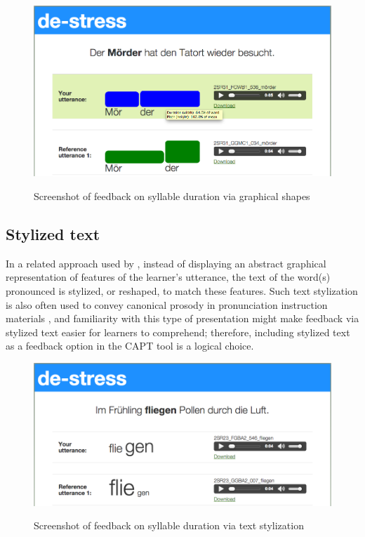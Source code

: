 	\begin{figure}
		\centering
		\caption{Screenshot of feedback on syllable duration via graphical shapes }
		\includegraphics[width=\textwidth]{img/screenshots/rectangles}
		\label{fig:visual:graphical}
	\end{figure}
	
	
	\subsection{Stylized text}
	\label{sec:visual:text}
	
	In a related approach used by \textcite{Sitaram2011}, instead of displaying an abstract graphical representation of 	features of the learner's utterance, the text of the word(s) pronounced is stylized, or reshaped, to match these features.
	Such text stylization is also often used to convey canonical prosody in pronunciation instruction materials \citep{Behme-Gissel2005,Hirschfeld2007a}, 
	and familiarity with this type of presentation might make feedback via stylized text easier for learners to comprehend; therefore,
	including stylized text as a feedback option in the CAPT tool is a logical choice.
	
	
	\begin{figure}
	\centering
	\caption{Screenshot of feedback on syllable duration via text stylization}
	\includegraphics[width=\textwidth]{img/screenshots/textStylization}
	\label{fig:visual:text}
	\end{figure}
	
